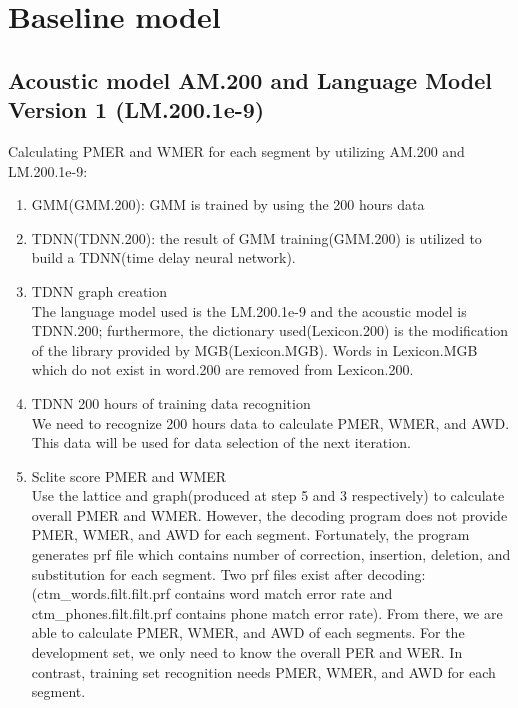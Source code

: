 
\section{Baseline model}

\subsection{Acoustic model AM.200 and Language Model Version 1 (LM.200.1e-9)}
\label{amv0s1}


Calculating PMER and WMER for each segment by utilizing AM.200 and LM.200.1e-9:
\begin{enumerate}
\item GMM(GMM.200): GMM is trained by using the 200 hours data
\item TDNN(TDNN.200): the result of GMM training(GMM.200) is utilized to build a TDNN(time delay neural network). 
\item TDNN graph creation \\
The language model used is the LM.200.1e-9 and  the acoustic model is  TDNN.200; furthermore, the dictionary used(Lexicon.200) is the modification of the library provided by MGB(Lexicon.MGB). Words in Lexicon.MGB which do not exist in word.200 are removed from Lexicon.200.
\item TDNN 200 hours of training data recognition \\
We need to recognize 200 hours data to calculate PMER, WMER, and AWD. This data will be used for data selection of the next iteration.
\item Sclite score PMER and WMER \\
Use the lattice and graph(produced at step 5 and 3 respectively) to calculate overall PMER and WMER. However, the decoding program does not provide PMER, WMER, and AWD for each segment. Fortunately, the program generates prf file which contains number of correction, insertion, deletion, and substitution for each segment. Two prf files exist after decoding:(ctm\_words.filt.filt.prf contains word match error rate and ctm\_phones.filt.filt.prf contains phone match error rate). From there, we are able to calculate  PMER, WMER, and AWD of each segments.  For the development set, we only need to know the overall PER and WER. In contrast, training set recognition needs PMER, WMER, and AWD for each segment. 

\end{enumerate}


